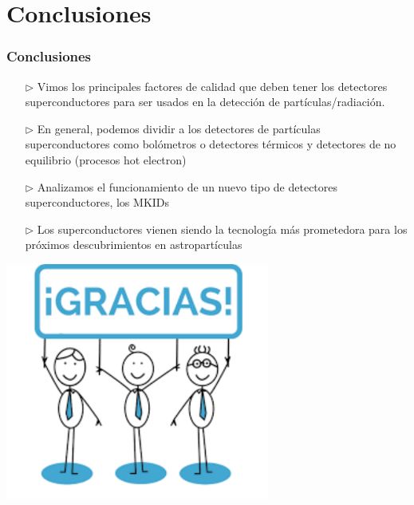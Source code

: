 \documentclass{beamer}
\begin{document}
\section{Conclusiones}
\begin{frame}
\frametitle{Conclusiones}
\begin{itemize}
\item[$\triangleright$] Vimos los principales factores de calidad que deben
				tener los	detectores superconductores para ser usados en la detección de
								partículas/radiación.
\item[$\triangleright$] En general, podemos dividir a los detectores de
				partículas superconductores como bolómetros o detectores térmicos y
								detectores de no equilibrio (procesos hot electron) 
\item[$\triangleright$] Analizamos el funcionamiento de un nuevo tipo de
				detectores superconductores, los MKIDs
\item[$\triangleright$] \alert{Los superconductores vienen siendo la tecnología más
				prometedora para los próximos descubrimientos en astropartículas}
\end{itemize}
\end{frame} 


\begin{frame}
				\begin{center}
								\includegraphics[height=0.6\textheight,width=0.65\textwidth]{logos/gracias}
				\end{center}
\end{frame}

\end{document}
